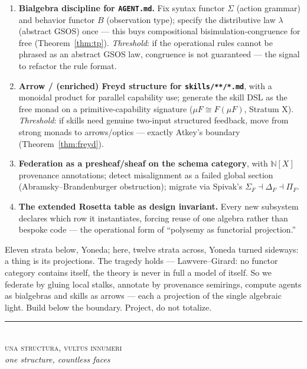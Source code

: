 \documentclass[11pt]{article}
\theoremstyle{plain}
\theoremstyle{definition}
\theoremstyle{remark}
\begin{document}
\begin{enumerate}[leftmargin=1.4em,itemsep=3pt]
\item \textbf{Bialgebra discipline for \texttt{AGENT.md}.} Fix syntax functor $\Sigma$ (action grammar) and behavior functor $B$ (observation type); specify the distributive law $\lambda$ (abstract GSOS) once --- this buys compositional bisimulation-congruence for free (Theorem~\ref{thm:tp}). \emph{Threshold}: if the operational rules cannot be phrased as an abstract GSOS law, congruence is not guaranteed --- the signal to refactor the rule format.
\item \textbf{Arrow / (enriched) Freyd structure for \texttt{skills/**/*.md}}, with a monoidal product for parallel capability use; generate the skill DSL as the free monad on a primitive-capability signature ($\mu F \cong F(\mu F)$, Stratum X). \emph{Threshold}: if skills need genuine two-input structured feedback, move from strong monads to arrows/optics --- exactly Atkey's boundary (Theorem~\ref{thm:freyd}).
\item \textbf{Federation as a presheaf/sheaf on the schema category}, with $\mathbb{N}[X]$ provenance annotations; detect misalignment as a failed global section (Abramsky--Brandenburger obstruction); migrate via Spivak's $\Sigma_F \dashv \Delta_F \dashv \Pi_F$.
\item \textbf{The extended Rosetta table as design invariant.} Every new subsystem declares which row it instantiates, forcing reuse of one algebra rather than bespoke code --- the operational form of ``polysemy as functorial projection.''
\end{enumerate}

Eleven strata below, Yoneda; here, twelve strata across, Yoneda turned sideways: a thing is its projections. The tragedy holds --- Lawvere--Girard: no functor category contains itself, the theory is never in full a model of itself. So we federate by gluing local stalks, annotate by provenance semirings, compute agents as bialgebras and skills as arrows --- each a projection of the single algebraic light. Build below the boundary. Project, do not totalize.

\vspace{1.5em}
\begin{center}
\color{silmaril}\rule{0.3\textwidth}{0.4pt}\\[0.5em]
\textsc{una structura, vultus innumeri}\\[0.2em]
{\color{forge}\itshape one structure, countless faces}
\end{center}
\end{document}
